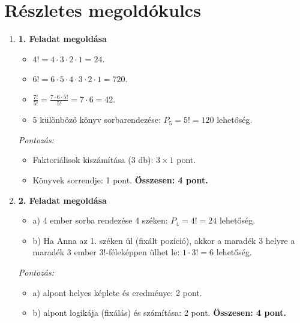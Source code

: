 \documentclass[12pt,a4paper]{article}
\begin{document}
\newpage
\section*{Részletes megoldókulcs}

\begin{enumerate}
    \item \textbf{1. Feladat megoldása}
    \begin{itemize}
        \item $4! = 4 \cdot 3 \cdot 2 \cdot 1 = 24$.
        \item $6! = 6 \cdot 5 \cdot 4 \cdot 3 \cdot 2 \cdot 1 = 720$.
        \item $\frac{7!}{5!} = \frac{7 \cdot 6 \cdot 5!}{5!} = 7 \cdot 6 = 42$.
        \item 5 különböző könyv sorbarendezése: $P_5 = 5! = 120$ lehetőség.
    \end{itemize}
    \emph{Pontozás:}
    \begin{itemize}
        \item Faktoriálisok kiszámítása (3 db): $3 \times 1$ pont.
        \item Könyvek sorrendje: 1 pont.
        \textbf{Összesen: 4 pont.}
    \end{itemize}

    \vspace{0.3cm}

    \item \textbf{2. Feladat megoldása}
    \begin{itemize}
        \item a) 4 ember sorba rendezése 4 széken: $P_4 = 4! = 24$ lehetőség.
        \item b) Ha Anna az 1. széken ül (fixált pozíció), akkor a maradék 3 helyre a maradék 3 ember $3!$-féleképpen ülhet le: $1 \cdot 3! = 6$ lehetőség.
    \end{itemize}
    \emph{Pontozás:}
    \begin{itemize}
        \item a) alpont helyes képlete és eredménye: 2 pont.
        \item b) alpont logikája (fixálás) és számítása: 2 pont.
        \textbf{Összesen: 4 pont.}
    \end{itemize}

    \vspace{0.3cm}


\end{enumerate}
\end{document}
